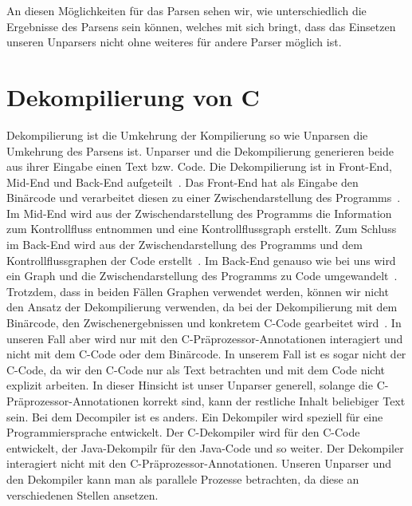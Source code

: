 An diesen Möglichkeiten für das Parsen sehen wir, wie unterschiedlich die Ergebnisse des Parsens sein können, welches mit sich bringt, dass das Einsetzen unseren Unparsers nicht ohne weiteres für andere Parser möglich ist.

 
\section{Dekompilierung von C}
Dekompilierung ist die Umkehrung der Kompilierung so wie Unparsen die Umkehrung des Parsens ist. Unparser und die Dekompilierung generieren beide aus ihrer Eingabe einen Text bzw. Code. Die Dekompilierung ist in Front-End, Mid-End und Back-End aufgeteilt~\cite{10.1145/3650212.3652144,Cifuentes1993AMF,10.1145/3395363.3397370}. Das Front-End hat als Eingabe den Binärcode und verarbeitet diesen zu einer Zwischendarstellung des Programms~\cite{Cifuentes1993AMF,10.1145/3395363.3397370}. Im Mid-End wird aus der Zwischendarstellung des Programms die Information zum Kontrollfluss entnommen und eine Kontrollflussgraph erstellt. Zum Schluss im Back-End wird aus der Zwischendarstellung des Programms und dem Kontrollflussgraphen der  Code erstellt~\cite{Cifuentes1993AMF,10.1145/3395363.3397370}. Im Back-End genauso wie bei uns wird ein Graph und die Zwischendarstellung des Programms zu Code umgewandelt~\cite{Cifuentes1993AMF,10.1145/3395363.3397370}. Trotzdem, dass in beiden Fällen Graphen verwendet werden, können wir nicht den Ansatz der Dekompilierung verwenden, da bei der Dekompilierung mit dem Binärcode, den Zwischenergebnissen und konkretem C-Code gearbeitet wird~\cite{10.1145/3650212.3652144,Cifuentes1993AMF,10.1145/3395363.3397370}. In unseren Fall aber wird nur mit den C-Präprozessor-Annotationen interagiert und nicht mit dem C-Code oder dem Binärcode. In unserem Fall ist es sogar nicht der C-Code, da wir den C-Code nur als Text betrachten und mit dem Code nicht explizit arbeiten. In dieser Hinsicht ist unser Unparser generell, solange die C-Präprozessor-Annotationen korrekt sind, kann der restliche Inhalt beliebiger Text sein. Bei dem Decompiler ist es anders. Ein Dekompiler wird speziell für eine Programmiersprache entwickelt. Der C-Dekompiler wird für den C-Code entwickelt, der Java-Dekompilr für den Java-Code und so weiter. Der Dekompiler interagiert nicht mit den C-Präprozessor-Annotationen. Unseren Unparser und den Dekompiler kann man als parallele Prozesse betrachten, da diese an verschiedenen Stellen ansetzen.

